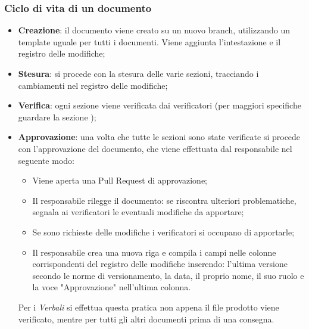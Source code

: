 \subsubsection{Ciclo di vita di un documento}
\begin{itemize}
    \item \textbf{Creazione}: il documento viene creato su un nuovo branch, utilizzando un template uguale per tutti i documenti. 
    Viene aggiunta l’intestazione e il registro delle modifiche;
    \item \textbf{Stesura}: si procede con la stesura delle varie sezioni, tracciando i cambiamenti nel registro delle modifiche; 
    \item \textbf{Verifica}: ogni sezione viene verificata dai verificatori (per maggiori specifiche guardare la 
    sezione ); 
    \item \textbf{Approvazione}: una volta che tutte le sezioni sono state verificate si procede 
    con l’approvazione del documento, che viene effettuata dal responsabile nel seguente modo:
    \begin{itemize}
        \item Viene aperta una Pull Request di approvazione;
        \item Il responsabile rilegge il documento: se riscontra ulteriori problematiche, segnala ai verificatori le eventuali modifiche da apportare;
        \item Se sono richieste delle modifiche i verificatori si occupano di apportarle;
        \item Il responsabile crea una nuova riga e compila i campi nelle colonne corrispondenti del registro delle modifiche 
        inserendo: l'ultima versione secondo le norme di versionamento, la data, il proprio nome, il suo ruolo e la voce "Approvazione" nell'ultima colonna.
    \end{itemize}
    Per i \textit{Verbali} si effettua questa pratica non appena il file prodotto viene 
    verificato, mentre per tutti gli altri documenti prima di una consegna.
\end{itemize}